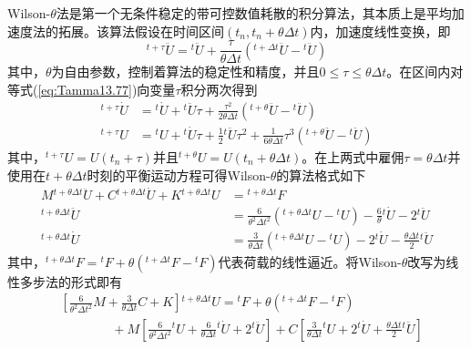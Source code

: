 Wilson-$\theta$法\cite{Wilson1968a}是第一个无条件稳定的带可控数值耗散的积分算法，其本质上是平均加速度法的拓展。该算法假设在时间区间$(t_n,t_{n}+\theta\Delta t)$内，加速度线性变换，即
\begin{equation}
{^{t+\tau}\!\ddot{U}}={^t\!\ddot{U}}+\frac{\tau}{\theta\Delta t}({^{t+\Delta t}\!\ddot{U}}-{^t\!\ddot{U}})\label{eq:Tamma13.77}
\end{equation}
其中，$\theta$为自由参数，控制着算法的稳定性和精度，并且$0\le\tau\le\theta\Delta t$。在区间内对等式(\ref{eq:Tamma13.77})向变量$\tau$积分两次得到
\begin{subequations}
\begin{align}
{^{t+\tau}\!\dot{U}}&={^t\!\dot{U}}+{^t\!\ddot{U}}\tau+\frac{\tau^2}{2\theta\Delta t}({^{t+\theta}\!\ddot{U}}-{^t\!\ddot{U}})\\
{^{t+\tau}\!U}&={^t\!U}+{^t\!\dot{U}}\tau+\frac{1}{2}{^t\!\ddot{U}}\tau^2+\frac{1}{6\theta\Delta t}\tau^3({^{t+\theta}\!\ddot{U}}-{^t\!\ddot{U}})
\end{align}\label{eq:Tamma13.79}
\end{subequations}
其中，${^{t+\tau}\!U}=U(t_n+\tau)$并且${^{t+\theta}\!U}=U(t_n+\theta\Delta t)$。在上两式中雇佣$\tau=\theta\Delta t$并使用在$t+\theta\Delta t$时刻的平衡运动方程可得Wilson-$\theta$的算法格式如下
\begin{subequations}
\begin{align}
M{^{t+\theta\Delta t}\!\ddot{U}}+C{^{t+\theta\Delta t}\!\dot{U}}+K{^{t+\theta\Delta t}\!U}&={^{t+\theta\Delta t}\!F}\\
{^{t+\theta\Delta t}\!\ddot{U}}&=\frac{6}{\theta^2\Delta t^2}({^{t+\theta\Delta t}\!U}-{^t\!U})-\frac{6}{\theta}{^t\!\dot{U}}-2{^t\!\ddot{U}}\\
{^{t+\theta\Delta t}\!\dot{U}}&=\frac{3}{\theta\Delta t}({^{t+\theta\Delta t}\!U}-{^t\!U})-2{^t\!\dot{U}}-\frac{\theta\Delta t}{2}{^t\!\ddot{U}}
\end{align}\label{ee:Tammma13.80}
\end{subequations}
其中，${^{t+\theta\Delta t}\!F}={^t\!F}+\theta({^{t+\Delta t}\!F}-{^t\!F})$代表荷载的线性逼近。将Wilson-$\theta$改写为线性多步法的形式即有
\begin{equation}
\begin{aligned}
&\left[\frac{6}{\theta^2\Delta t^2}M+\frac{3}{\theta\Delta t}C+K\right]{^{t+\theta\Delta t}\!U}={^t\!F}+\theta({^{t+\Delta t}\!F}-{^t\!F})\\
&\qquad\qquad+M\left[\frac{6}{\theta^2\Delta t^2}{^t\!U}+\frac{6}{\theta\Delta t}{^t\!\dot{U}}+2{^t\!\ddot{U}}\right]+C\left[\frac{3}{\theta\Delta t}{^t\!U}+2{^t\!\dot{U}}+\frac{\theta\Delta t}{2}{^t\!\ddot{U}}\right]
\end{aligned}
\end{equation}
